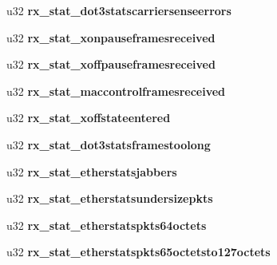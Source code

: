 \begin{DoxyCompactItemize}
\item 
\hypertarget{structemac__stats_a721c493a3fc868cf81a66cea1321b042}{
u32 {\bfseries rx\_\-stat\_\-dot3statscarriersenseerrors}}
\label{structemac__stats_a721c493a3fc868cf81a66cea1321b042}

\item 
\hypertarget{structemac__stats_add66bc5e220d7df6fbce03985c23069c}{
u32 {\bfseries rx\_\-stat\_\-xonpauseframesreceived}}
\label{structemac__stats_add66bc5e220d7df6fbce03985c23069c}

\item 
\hypertarget{structemac__stats_a3c0938497596ebfb045e65cfb2ac239e}{
u32 {\bfseries rx\_\-stat\_\-xoffpauseframesreceived}}
\label{structemac__stats_a3c0938497596ebfb045e65cfb2ac239e}

\item 
\hypertarget{structemac__stats_a84e31225f921b94d816cf2aef8d18868}{
u32 {\bfseries rx\_\-stat\_\-maccontrolframesreceived}}
\label{structemac__stats_a84e31225f921b94d816cf2aef8d18868}

\item 
\hypertarget{structemac__stats_a84b74df02bff77644c38a1dbad86c682}{
u32 {\bfseries rx\_\-stat\_\-xoffstateentered}}
\label{structemac__stats_a84b74df02bff77644c38a1dbad86c682}

\item 
\hypertarget{structemac__stats_a65194a19f8dcdda9034616d4296665dc}{
u32 {\bfseries rx\_\-stat\_\-dot3statsframestoolong}}
\label{structemac__stats_a65194a19f8dcdda9034616d4296665dc}

\item 
\hypertarget{structemac__stats_a17b2c24c02c55cb799502db26c7485bf}{
u32 {\bfseries rx\_\-stat\_\-etherstatsjabbers}}
\label{structemac__stats_a17b2c24c02c55cb799502db26c7485bf}

\item 
\hypertarget{structemac__stats_ab15c23b5754d5d4f4e453a04c42ea1a5}{
u32 {\bfseries rx\_\-stat\_\-etherstatsundersizepkts}}
\label{structemac__stats_ab15c23b5754d5d4f4e453a04c42ea1a5}

\item 
\hypertarget{structemac__stats_ae4c9d53e57fea3cea74b66270d52a188}{
u32 {\bfseries rx\_\-stat\_\-etherstatspkts64octets}}
\label{structemac__stats_ae4c9d53e57fea3cea74b66270d52a188}

\item 
\hypertarget{structemac__stats_a6463f8dc78e3db89d1ddecc9d1365481}{
u32 {\bfseries rx\_\-stat\_\-etherstatspkts65octetsto127octets}}
\label{structemac__stats_a6463f8dc78e3db89d1ddecc9d1365481}


\end{DoxyCompactItemize}
